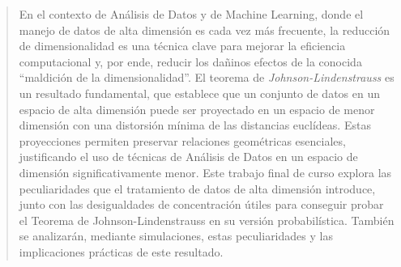 \begin{abstract}
	En el contexto de Análisis de Datos y de Machine Learning,
	donde el manejo de datos de alta dimensión es cada vez más
	frecuente, la reducción de dimensionalidad es una técnica clave
	para mejorar la eficiencia computacional y, por ende, reducir los
	dañinos efectos de la conocida ``maldición de la dimensionalidad''.
	El teorema de \emph{Johnson-Lindenstrauss} es un resultado
	fundamental, que establece que un conjunto de datos en un espacio
	de alta dimensión puede ser proyectado en un espacio de menor
	dimensión con una distorsión mínima de las distancias euclídeas.
	Estas proyecciones permiten preservar relaciones geométricas
	esenciales, justificando el uso de técnicas de Análisis de Datos en
	un espacio de dimensión significativamente menor.
	Este trabajo final de curso explora las peculiaridades que el
	tratamiento de datos de alta dimensión introduce, junto con las
	desigualdades de concentración útiles para conseguir probar el
	Teorema de Johnson-Lindenstrauss en su versión probabilística.
	También se analizarán, mediante simulaciones, estas peculiaridades
	y las implicaciones prácticas de este resultado.
\end{abstract}
